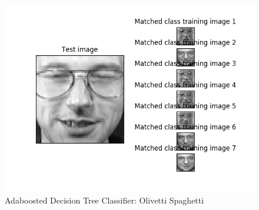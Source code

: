 \documentclass{article}
\begin{document}
\begin{figure}
    \centering
    \includegraphics[scale = 0.90]{Olivetti.png}
    \caption{Adaboosted Decision Tree Classifier: Olivetti Spaghetti}
\end{figure}
\end{document}
